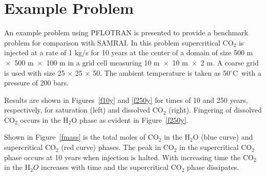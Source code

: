 \documentclass[12pt]{article}
\newcommand{\degc}{$^\circ$C}
\begin{document}
\section{Example Problem}

An example problem using PFLOTRAN is presented to provide a benchmark problem for comparison with SAMRAI. In this problem supercritical CO$_2$ is injected at a rate of 1 kg/s for 10 years at the center of a domain of size 500 m $\!\times\!$ 500 m $\!\times\!$ 100 m in a grid cell measuring 10 m $\!\times\!$ 10 m $\!\times\!$ 2 m. A coarse grid is used with size 25 $\times$ 25 $\times$ 50. The ambient temperature is taken as 50\degc\ with a pressure of 200 bars.

Results are shown in Figures~\ref{f10y} and \ref{f250y} for times of 10 and 250 years, respectively, for saturation (left) and dissolved CO$_2$ (right). Fingering of dissolved CO$_2$ occurs in the H$_2$O phase as evident in Figure~\ref{f250y}.

Shown in Figure~\ref{fmass} is the total moles of CO$_2$ in the H$_2$O (blue curve) and supercritical CO$_2$ (red curve) phases. The peak in CO$_2$ in the supercritical CO$_2$ phase occurs at 10 years when injection is halted. With increasing time the CO$_2$ in the H$_2O$ increases with time and the supercritical CO$_2$ phase dissipates.
\end{document}
